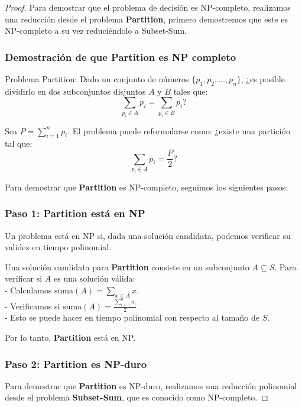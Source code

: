 \documentclass{report}
\begin{document}
	\begin{proof}
		
	Para demostrar que el problema de decisión es NP-completo, realizamos una reducción desde el problema \textbf{Partition}, primero demostremos que este es NP-completo a su vez reduciéndolo a Subset-Sum.
	
	\subsubsection{Demostración de que Partition es NP completo}
	
	Problema Partition:	Dado un conjunto de números $ \{p_1, p_2, \dots, p_n\} $, ¿es posible dividirlo en dos subconjuntos disjuntos $ A $ y $ B $ tales que:
	\[
	\sum_{p_i \in A} p_i = \sum_{p_i \in B} p_i?
	\]
	
	Sea $ P = \sum_{i=1}^n p_i $. El problema puede reformularse como: ¿existe una partición tal que:
	\[
	\sum_{p_i \in A} p_i = \frac{P}{2}?
	\]
	
	
	Para demostrar que \textbf{Partition} es NP-completo, seguimos los siguientes pasos:
	
	\subsubsection*{Paso 1: Partition está en NP}
	
	Un problema está en NP si, dada una solución candidata, podemos verificar su validez en tiempo polinomial.
	
	Una solución candidata para \textbf{Partition} consiste en un subconjunto $ A \subseteq S $. Para verificar si $ A $ es una solución válida:\\
	- Calculamos $ \text{suma}(A) = \sum_{x \in A} x $.\\
	- Verificamos si $ \text{suma}(A) = \frac{\sum_{i=1}^n a_i}{2} $.\\
	- Esto se puede hacer en tiempo polinomial con respecto al tamaño de $ S $.
	
	Por lo tanto, \textbf{Partition} está en NP.
	
	\subsubsection*{Paso 2: Partition es NP-duro}
	
	Para demostrar que \textbf{Partition} es NP-duro, realizamos una reducción polinomial desde el problema \textbf{Subset-Sum}, que es conocido como NP-completo.
	

\end{proof}
\end{document}
